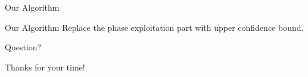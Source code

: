 \documentclass[serif]{beamer}
\begin{document}
\begin{frame}{Our Algorithm}
\begin{block}{Our Algorithm}
Replace the phase exploitation part with upper confidence bound.

\end{block}

\end{frame}





\begin{frame}{Question?}
\begin{center}
\Huge{Thanks for your time!}
\end{center}
\end{frame}
\end{document}
